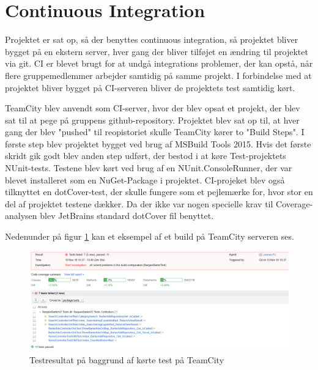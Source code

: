 \section{Continuous Integration}
Projektet er sat op, så der benyttes continuous integration, så projektet bliver bygget på en ekstern server, hver gang der bliver tilføjet en ændring til projektet via git. CI er blevet brugt for at undgå integrations problemer, der kan opstå, når flere gruppemedlemmer arbejder samtidig på samme projekt.
I forbindelse med at projektet bliver bygget på CI-serveren bliver de projektets test samtidig kørt.

TeamCity blev anvendt som CI-server, hvor der blev opsat et  projekt, der blev sat til at pege på gruppens github-repository. Projektet blev sat op til, at hver gang der blev "pushed" til reopistoriet skulle TeamCity kører to "Build Steps". I første step blev projektet bygget ved brug af MSBuild Tools 2015. Hvis det første skridt gik godt blev anden step udført, der bestod i at køre Test-projektets NUnit-tests. Testene blev kørt ved brug af en NUnit.ConsoleRunner, der var blevet installeret som en NuGet-Package i projektet.  
CI-projeket blev også tilknyttet en dotCover-test, der skulle fungere som et pejlemærke for, hvor stor en del af projektet testene dækker. Da der ikke var nogen specielle krav til Coverage-analysen blev JetBrains standard dotCover fil benyttet.

\noindent Nedenunder på figur \ref{fig:TeamCityTest} kan et eksempel af et build på TeamCity serveren ses. 
\begin{figure}[ht!]
	\centering
	\includegraphics[width=120mm]{figures/TeamCityTest.png}
	\caption{Testresultat på baggrund af kørte test på TeamCity}
	\label{fig:TeamCityTest}
\end{figure}

